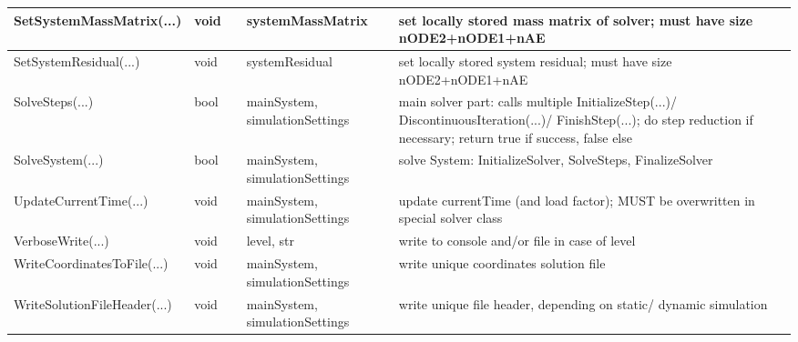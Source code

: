 \begin{center}
\begin{longtable}{| p{4.2cm} | p{2.5cm} | p{0.3cm} | p{3.0cm} | p{6cm} |}
    SetSystemMassMatrix(...) &     void &      &     systemMassMatrix &     set locally stored mass matrix of solver; must have size nODE2+nODE1+nAE\\ \hline
    SetSystemResidual(...) &     void &      &     systemResidual &     set locally stored system residual; must have size nODE2+nODE1+nAE\\ \hline
    SolveSteps(...) &     bool &      &     mainSystem, simulationSettings &     main solver part: calls multiple InitializeStep(...)/ DiscontinuousIteration(...)/ FinishStep(...); do step reduction if necessary; return true if success, false else\\ \hline
    SolveSystem(...) &     bool &      &     mainSystem, simulationSettings &     solve System: InitializeSolver, SolveSteps, FinalizeSolver\\ \hline
    UpdateCurrentTime(...) &     void &      &     mainSystem, simulationSettings &     update currentTime (and load factor); MUST be overwritten in special solver class\\ \hline
    VerboseWrite(...) &     void &      &     level, str &     write to console and/or file in case of level\\ \hline
    WriteCoordinatesToFile(...) &     void &      &     mainSystem, simulationSettings &     write unique coordinates solution file\\ \hline
    WriteSolutionFileHeader(...) &     void &      &     mainSystem, simulationSettings &     write unique file header, depending on static/ dynamic simulation\\ \hline
	  \end{longtable}
	\end{center}



